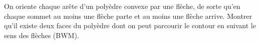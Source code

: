 On oriente chaque arête d'un polyèdre convexe par une flèche, de sorte qu'en chaque sommet au moins une flèche parte et au moins une flèche arrive. Montrer qu'il existe deux faces du polyèdre dont on peut parcourir le contour en suivant le sens des flèches (BWM).
